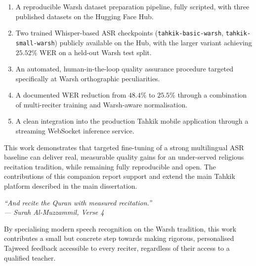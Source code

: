 \begin{emeraldbox}[title=Key Contributions]
\begin{enumerate}
  \item A reproducible Warsh dataset preparation pipeline, fully
        scripted, with three published datasets on the Hugging Face Hub.
  \item Two trained Whisper-based ASR checkpoints
        (\texttt{tahkik-basic-warsh}, \texttt{tahkik-small-warsh})
        publicly available on the Hub, with the larger variant
        achieving $25.52\%$ WER on a held-out Warsh test split.
  \item An automated, human-in-the-loop quality assurance procedure
        targeted specifically at Warsh orthographic peculiarities.
  \item A documented WER reduction from $48.4\%$ to $25.5\%$ through a
        combination of multi-reciter training and Warsh-aware
        normalisation.
  \item A clean integration into the production Tahkik mobile
        application through a streaming WebSocket inference service.
\end{enumerate}
\end{emeraldbox}

This work demonstrates that targeted fine-tuning of a strong
multilingual ASR baseline can deliver real, measurable quality gains
for an under-served religious recitation tradition, while remaining
fully reproducible and open. The contributions of this companion report
support and extend the main Tahkik platform described in the main
dissertation.

\begin{emeraldbox}[title=Closing Statement]
\begin{center}
\large\itshape
``And recite the Quran with measured recitation.''\\[6pt]
\normalsize\normalfont\color{black} --- Surah Al-Muzzammil, Verse 4
\end{center}
\vspace{6pt}
\normalsize
By specialising modern speech recognition on the Warsh tradition, this
work contributes a small but concrete step towards making rigorous,
personalised Tajweed feedback accessible to every reciter, regardless
of their access to a qualified teacher.
\end{emeraldbox}
\appendix


